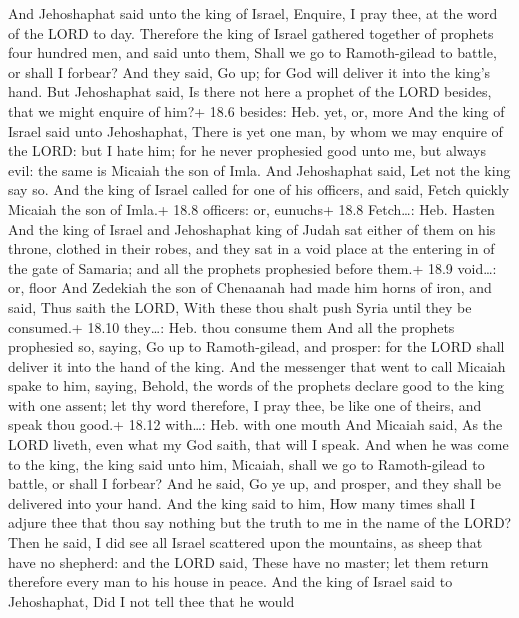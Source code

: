 And Jehoshaphat said unto the king of Israel, Enquire, I
pray thee, at the word of the LORD to day.  Therefore the
king of Israel gathered together of prophets four hundred men, and said
unto them, Shall we go to Ramoth-gilead to battle, or shall I forbear?
And they said, Go up; for God will deliver it into the king's hand.
 But Jehoshaphat said, Is there not here a prophet of the
LORD besides, that we might enquire of him?+ 18.6 besides: Heb. yet, or,
more  And the king of Israel said unto Jehoshaphat, There is
yet one man, by whom we may enquire of the LORD: but I hate him; for he
never prophesied good unto me, but always evil: the same is Micaiah the
son of Imla. And Jehoshaphat said, Let not the king say so. 
And the king of Israel called for one of his officers, and said, Fetch
quickly Micaiah the son of Imla.+ 18.8 officers: or, eunuchs+ 18.8
Fetch\ldots: Heb. Hasten  And the king of Israel and
Jehoshaphat king of Judah sat either of them on his throne, clothed in
their robes, and they sat in a void place at the entering in of the gate
of Samaria; and all the prophets prophesied before them.+ 18.9
void\ldots: or, floor  And Zedekiah the son of Chenaanah
had made him horns of iron, and said, Thus saith the LORD, With these
thou shalt push Syria until they be consumed.+ 18.10 they\ldots: Heb.
thou consume them  And all the prophets prophesied so,
saying, Go up to Ramoth-gilead, and prosper: for the LORD shall deliver
it into the hand of the king.  And the messenger that went
to call Micaiah spake to him, saying, Behold, the words of the prophets
declare good to the king with one assent; let thy word therefore, I pray
thee, be like one of theirs, and speak thou good.+ 18.12 with\ldots:
Heb. with one mouth  And Micaiah said, As the LORD liveth,
even what my God saith, that will I speak.  And when he was
come to the king, the king said unto him, Micaiah, shall we go to
Ramoth-gilead to battle, or shall I forbear? And he said, Go ye up, and
prosper, and they shall be delivered into your hand.  And
the king said to him, How many times shall I adjure thee that thou say
nothing but the truth to me in the name of the LORD?  Then
he said, I did see all Israel scattered upon the mountains, as sheep
that have no shepherd: and the LORD said, These have no master; let them
return therefore every man to his house in peace.  And the
king of Israel said to Jehoshaphat, Did I not tell thee that he would
